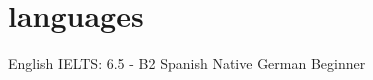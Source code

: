 \documentclass[]{twentysecondcv}
\begin{document}
\section{languages}

\begin{twentyshort}
 \twentyitemshort
    {English}
    {IELTS: 6.5 - B2}
  \twentyitemshort
    {Spanish}
    {Native}
  \twentyitemshort
    {German}
    {Beginner}
\end{twentyshort}








\end{document}
